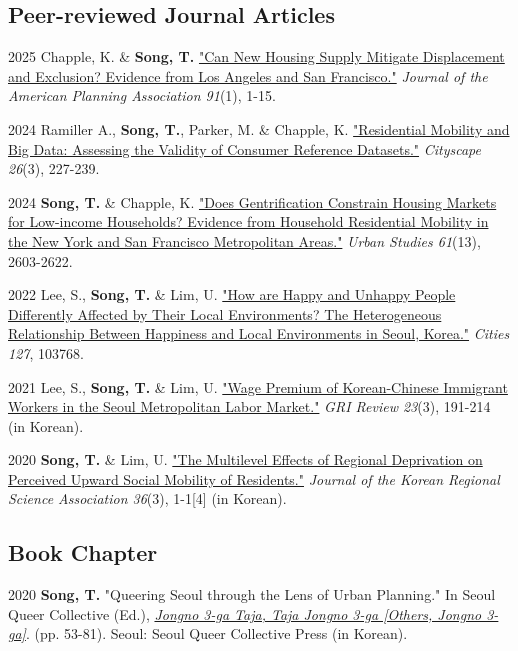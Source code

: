 \documentclass[12pt,letterpaper]{report}
\begin{document}
    \subsection*{Peer-reviewed Journal Articles}
    \begin{tablist}
        \item[2025] \tab{}Chapple, K. \& \textbf{Song, T.} \href{https://doi.org/10.1080/01944363.2024.2319293}{"Can New Housing Supply Mitigate Displacement and Exclusion? Evidence from Los Angeles and San Francisco."} \emph{Journal of the American Planning Association 91}(1), 1-15.
        \item[2024] \tab{}Ramiller A., \textbf{Song, T.}, Parker, M. \& Chapple, K. \href{https://www.jstor.org/stable/48799257}{"Residential Mobility and Big Data: Assessing the Validity of Consumer Reference Datasets."} \emph{Cityscape 26}(3), 227-239.
        \item[2024] \tab{}\textbf{Song, T.} \& Chapple, K. \href{https://doi.org/10.1177/00420980241244699}{"Does Gentrification Constrain Housing Markets for Low-income Households? Evidence from Household Residential Mobility in the New York and San Francisco Metropolitan Areas."} \emph{Urban Studies 61}(13), 2603-2622.
        \item[2022] \tab{}Lee, S., \textbf{Song, T.} \& Lim, U. \href{https://doi.org/10.1016/j.cities.2022.103768}{"How are Happy and Unhappy People Differently Affected by Their Local Environments? The Heterogeneous Relationship Between Happiness and Local Environments in Seoul, Korea."} \emph{Cities 127}, 103768.
        \item[2021] \tab{}Lee, S., \textbf{Song, T.} \& Lim, U. \href{https://www.dbpia.co.kr/Journal/articleDetail?nodeId=NODE11025769}{"Wage Premium of Korean-Chinese Immigrant Workers in the Seoul Metropolitan Labor Market."} \emph{GRI Review 23}(3), 191-214 (in Korean).
        \item[2020] \tab{}\textbf{Song, T.} \& Lim, U. \href{"https://www.koreascience.or.kr/article/JAKO202030161655441.page}{"The Multilevel Effects of Regional Deprivation on Perceived Upward Social Mobility of Residents."} \emph{Journal of the Korean Regional Science Association 36}(3), 1-1[4] (in Korean).
    \end{tablist}
    \subsection*{Book Chapter}
    \begin{tablist}
        \item[2020] \tab{}\textbf{Song, T.} "Queering Seoul through the Lens of Urban Planning." In Seoul Queer Collective (Ed.), \emph{\href{http://www.kyobobook.co.kr/product/detailViewKor.laf?ejkGb=KOR&mallGb=KOR&barcode=9791197096501}{Jongno 3-ga Taja, Taja Jongno 3-ga [Others, Jongno 3-ga]}}. (pp. 53-81). Seoul: Seoul Queer Collective Press (in Korean).
    \end{tablist}
\end{document}
